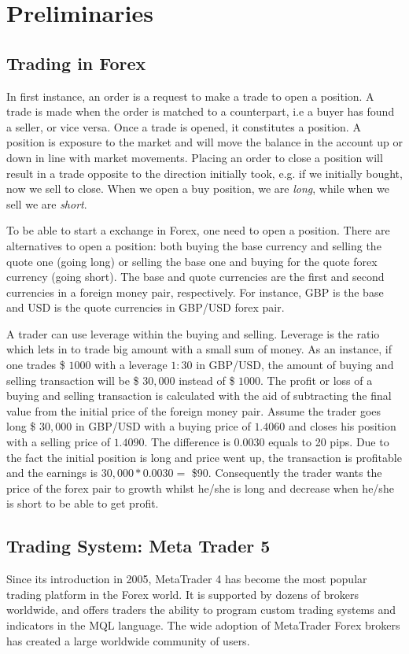 \section{Preliminaries}

\subsection{Trading in Forex}
In first instance, an order is a request to make a trade to open a position.
A trade is made when the order is matched to a counterpart, i.e a buyer has found a seller, or vice versa.
Once a trade is opened, it constitutes a position. A position is exposure to the market and will move the balance in the account up or down in line with market movements. Placing an order to close a position will result in a trade opposite to the direction initially took, e.g. if we initially bought, now we sell to close. When we open a buy position, we are \textit{long}, while when we sell we are \textit{short}.

To be able to start a exchange in Forex, one need to open a position. There are alternatives to open a position: both buying the base currency and selling the quote one (going long) or selling the base one and buying for the quote forex currency (going short). The base and quote currencies are the first and second currencies in a foreign money pair, respectively. For instance, GBP is the base and USD is the quote currencies in GBP/USD forex pair.

A trader can use leverage within the buying and selling. Leverage is the ratio which lets in to trade big amount with a small sum of money. As an instance, if one trades \$ $1000$ with a leverage $1:30$ in GBP/USD, the amount of buying and selling transaction will be \$ $30,000$ instead of \$ $1000$.
The profit or loss of a buying and selling transaction is calculated with the aid of subtracting the final value from the initial price of the foreign money pair. Assume the trader goes long  \$ $30,000$ in GBP/USD with a buying price of $1.4060$ and closes his position with a selling price of $1.4090$. The difference is $0.0030$ equals to 20 pips. Due to the fact the initial position is long and price went up, the transaction is profitable and the earnings is $30,000 * 0.0030 =$ \$90. Consequently the trader wants the price of the forex pair to growth whilst he/she is long and decrease when he/she is short to be able to get profit.

\subsection{Trading System: Meta Trader 5}
Since its introduction in 2005, MetaTrader 4 has become the most popular trading platform in the Forex world. It is supported by dozens of brokers worldwide, and offers traders the ability to program custom trading systems and indicators in the MQL language. The wide adoption of MetaTrader Forex brokers has created a large worldwide community of users.

